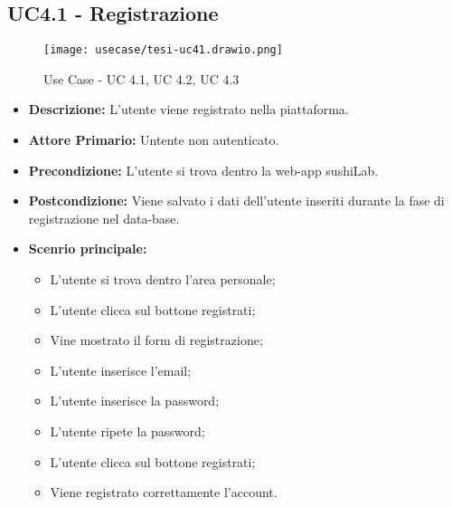 \subsection{UC4.1 - Registrazione}
\begin{figure}[H]
    \centering
    \texttt{[image: usecase/tesi-uc41.drawio.png]}
    \caption{Use Case - UC 4.1, UC 4.2, UC 4.3}
\end{figure}
\begin{itemize}
    \item \textbf{Descrizione:} L'utente viene registrato nella piattaforma.
    \item \textbf{Attore Primario:} Untente non autenticato.
    \item \textbf{Precondizione:} L'utente si trova dentro la web-app sushiLab.
    \item \textbf{Postcondizione:} Viene salvato i dati dell'utente inseriti durante la fase di registrazione nel data-base.
    \item \textbf{Scenrio principale:}
    \begin{itemize}
        \item L'utente si trova dentro l'area personale;
        \item L'utente clicca sul bottone registrati;
        \item Vine mostrato il form di registrazione;
        \item L'utente inserisce l'email;
        \item L'utente inserisce la password;
        \item L'utente ripete la password;
        \item L'utente clicca sul bottone registrati;
        \item Viene registrato correttamente l'account.
    \end{itemize}
\end{itemize}
